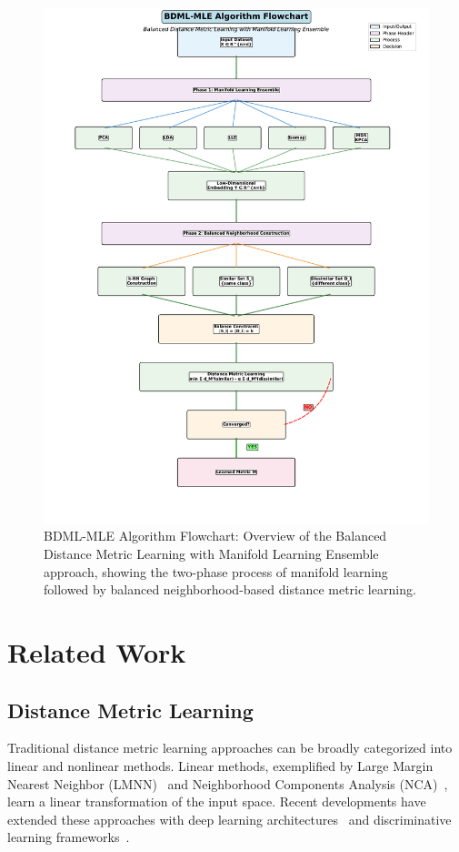 \documentclass[review]{elsarticle}
\begin{document}
\begin{figure}[htbp]
\centering
\includegraphics[width=\textwidth]{bdml_mle_improved_flowchart.pdf}
\caption{BDML-MLE Algorithm Flowchart: Overview of the Balanced Distance Metric Learning with Manifold Learning Ensemble approach, showing the two-phase process of manifold learning followed by balanced neighborhood-based distance metric learning.}
\label{fig:bdml_flowchart}
\end{figure}

\section{Related Work}

\subsection{Distance Metric Learning}

Traditional distance metric learning approaches can be broadly categorized into linear and nonlinear methods. Linear methods, exemplified by Large Margin Nearest Neighbor (LMNN)~\cite{weinberger2009distance} and Neighborhood Components Analysis (NCA)~\cite{goldberger2005neighbourhood}, learn a linear transformation of the input space. Recent developments have extended these approaches with deep learning architectures~\cite{xu2025deep} and discriminative learning frameworks~\cite{duan2025discriminative}.
\end{document}
